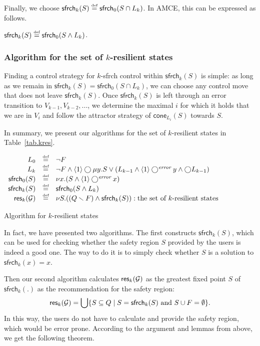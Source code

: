 \documentclass[times,10pt,twocolumn]{article}
\newcommand\cla{\mathsf{cone}}
\newcommand\res{\mathsf{res}}
\newcommand\safe{\mathsf{sfrch}}
\newcommand{\emserr}{\textit{\scriptsize error}}
\newcommand{\defn}{\stackrel{\mbox{\tiny def}}{=}}
\newcommand{\nxt}{\bigcirc}
\newcommand{\calg}{{\cal G}}
\begin{document}
Finally, we choose $\safe_k(S) \defn \safe_0(S \cap L_k)$.  
In AMCE, this can be expressed as follows. 
\begin{center} 
$\safe_k(S)\defn \safe_0(S\wedge L_k)$.
\end{center} 


\subsubsection{Algorithm for the set of $k$-resilient states} 

Finding a control strategy for $k$-sfrch control within 
$\safe_k(S)$ is simple:
as long as we remain in $\safe_k(S)=\safe_0(S \cap L_k)$, 
we can choose any control move that does not leave $\safe_k(S)$.
Once $\safe_k(S)$ is left through an error transition to $V_{k-1},
V_{k-2}, ...$, 
we determine the maximal $i$ for which it holds that we are in $V_i$ 
and follow the attractor strategy of $\cla_{L_i}(S)$ towards $S$.


In summary, we present our algorithms for the set of $k$-resilient states in 
Table~\ref{tab.kres}.  
\begin{table*}
\begin{center} 
$\begin{array}{rcl} 
L_0   & \defn 
& \neg F \\
L_k   & \defn 
& \neg F \wedge \langle 1 \rangle \nxt \mu y.S\vee(L_{k-1} \wedge \langle 1 \rangle \nxt^{\emserr} y \wedge \nxt L_{k-1})\\
\safe_0(S)	& \defn 
& \nu x.(S\wedge\langle 1\rangle \nxt^{\emserr} x)\\
\safe_k(S)	& \defn 
& \safe_0(S\wedge L_k)\\
\res_k(\calg) &\defn 
& \nu S. ((Q\smallsetminus F)\wedge\safe_k(S)): \mbox{the set of $k$-resilient states}\\
\end{array}$ 
\caption{Algorithm for $k$-resilient states} 
\label{tab.kres} 
\end{center} 
\end{table*} 
In fact, we have presented two algorithms. 
\label{reply2.2alg.sec} 
The first constructs $\safe_k(S)$, which can be used for checking whether the safety region $S$ 
provided by the users is indeed a good one. 
The way to do it is to simply check whether $S$ is a solution to $\safe_k(x)=x$. 


Then our second algorithm calculates $\res_k(\calg)$ as the greatest fixed point $S$ of $\safe_k(.)$  
as the recommendation for the safety region:
$$ \res_k(\calg) = \bigcup \{S \subseteq Q \mid S = \safe_k(S) \mbox{ and } S\cup F = \emptyset\}.$$
In this way, the users do not have to calculate and provide the safety region, which would be error prone.
According to the argument and lemmas from above, 
we get the following theorem. 
\end{document}
